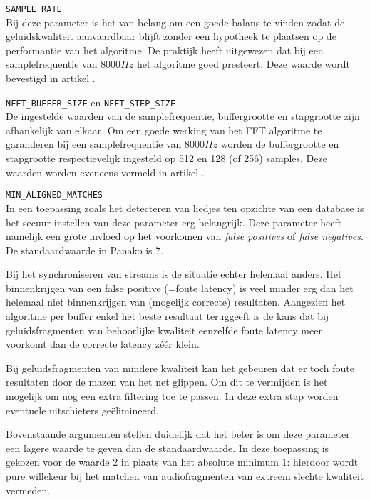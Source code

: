 \begin{description}
	\item\texttt{SAMPLE\_RATE} \hfill \\
	Bij deze parameter is het van belang om een goede balans te vinden zodat de geluidskwaliteit aanvaardbaar blijft zonder een hypotheek te plaatsen op de performantie van het algoritme. De praktijk heeft uitgewezen dat bij een samplefrequentie van $ 8000Hz $ het algoritme goed presteert. Deze waarde wordt bevestigd in artikel \cite{six2015multimodal}.
	\item\texttt{NFFT\_BUFFER\_SIZE} en \texttt{NFFT\_STEP\_SIZE} \hfill \\
	De ingestelde waarden van de samplefrequentie, buffergrootte en stapgrootte zijn afhankelijk van elkaar. Om een goede werking van het FFT algoritme te garanderen bij een samplefrequentie van $ 8000Hz $ worden de buffergrootte en stapgrootte respectievelijk ingesteld op 512 en 128 (of 256) samples. Deze waarden worden eveneens vermeld in artikel \cite{six2015multimodal}.
	\item\texttt{MIN\_ALIGNED\_MATCHES} \hfill \\
	In een toepassing zoals het detecteren van liedjes ten opzichte van een database is het secuur instellen van deze parameter erg belangrijk. Deze parameter heeft namelijk een grote invloed op het voorkomen van \textit{false positives} of \textit{false negatives}. De standaardwaarde in Panako is 7.
	
	Bij het synchroniseren van streams is de situatie echter helemaal anders. Het binnenkrijgen van een false positive (=foute latency) is veel minder erg dan het helemaal niet binnenkrijgen van (mogelijk correcte) resultaten. Aangezien het algoritme per buffer enkel het beste resultaat teruggeeft is de kans dat bij geluidsfragmenten van behoorlijke kwaliteit eenzelfde foute latency meer voorkomt dan de correcte latency zéér klein.
	
	Bij geluidsfragmenten van mindere kwaliteit kan het gebeuren dat er toch foute resultaten door de mazen van het net glippen. Om dit te vermijden is het mogelijk om nog een extra filtering toe te passen. In deze extra stap worden eventuele uitschieters geëlimineerd.
	
	Bovenstaande argumenten stellen duidelijk dat het beter is om deze parameter een lagere waarde te geven dan de standaardwaarde. In deze toepassing is gekozen voor de waarde 2 in plaats van het absolute minimum 1: hierdoor wordt pure willekeur bij het matchen van audiofragmenten van extreem slechte kwaliteit vermeden.
	

\end{description}
